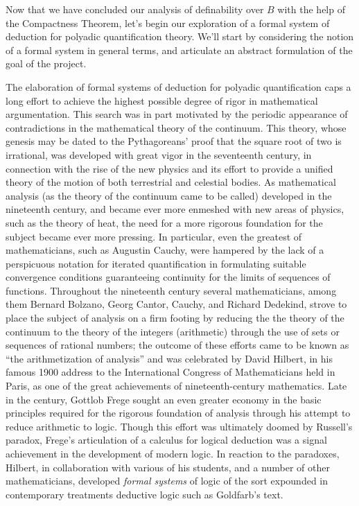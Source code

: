 \iffalse
Now that we have concluded our analysis of definability over $B$ with the help of the Compactness Theorem, let's begin our exploration of a formal system of deduction for polyadic quantification theory. We'll start by considering the notion of a formal system in general terms, and articulate an abstract formulation of the goal of the project.

The elaboration of formal systems of deduction for polyadic quantification caps a long effort to achieve the highest possible degree of rigor in mathematical argumentation. This search was in part motivated by the periodic appearance of contradictions in the mathematical theory of the continuum. This theory, whose genesis may be dated to the Pythagoreans' proof that the square root of two is irrational, was developed with great vigor in the seventeenth century, in connection with the rise of the new physics and its effort to provide a unified theory of the motion of both terrestrial and celestial bodies. As mathematical analysis (as the theory of the continuum came to be called) developed in the nineteenth century, and became ever more enmeshed with new areas of physics, such as the theory of heat, the need for a more rigorous foundation for the subject became ever more pressing. In particular, even the greatest of mathematicians, such as Augustin Cauchy, were hampered by the lack of a perspicuous notation for iterated quantification in formulating suitable convergence conditions guaranteeing continuity for the limits of sequences of functions. Throughout the nineteenth century several mathematicians, among them Bernard Bolzano, Georg Cantor, Cauchy, and Richard Dedekind, strove to place the subject of analysis on a firm footing by reducing the the theory of the continuum to the theory of the integers (arithmetic) through the use of sets or sequences of rational numbers; the outcome of these efforts came to be known as ``the arithmetization of analysis'' and was celebrated by David Hilbert, in his famous 1900 address to the International Congress of Mathematicians held in Paris, as one of the great achievements of nineteenth-century mathematics. Late in the century, Gottlob Frege sought an even greater economy in the basic principles required for the rigorous foundation of analysis through his attempt to reduce arithmetic to logic. Though this effort was ultimately doomed by Russell's paradox, Frege's articulation of a calculus for logical deduction was a signal achievement in the development of modern logic. In reaction to the paradoxes, Hilbert, in collaboration with various of his students, and a number of other mathematicians, developed \emph{formal systems} of logic of the sort expounded in contemporary treatments deductive logic such as Goldfarb's text. 


